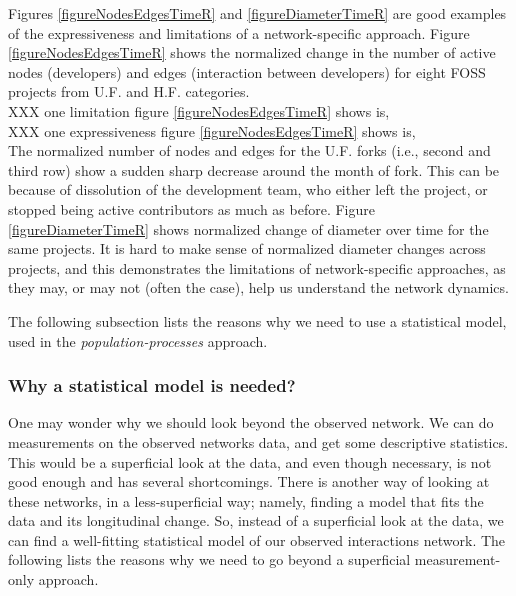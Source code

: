 \documentclass[11pt]{report}
\begin{document}
Figures \ref{figureNodesEdgesTimeR} and \ref{figureDiameterTimeR} are good examples of the expressiveness and limitations of a network-specific approach. Figure \ref{figureNodesEdgesTimeR} shows the normalized change in the number of active nodes (developers) and edges (interaction between developers) for eight FOSS projects from U.F. and H.F. categories. \\

XXX one limitation figure \ref{figureNodesEdgesTimeR} shows is, \\
XXX one expressiveness figure \ref{figureNodesEdgesTimeR} shows is, \\



The normalized number of nodes and edges for the U.F. forks (i.e., second and third row) show a sudden sharp decrease around the month of fork. This can be because of dissolution of the development team, who either left the project, or stopped being active contributors as much as before. Figure  \ref{figureDiameterTimeR} shows normalized change of diameter over time for the same projects. It is hard to make sense of normalized diameter changes across projects, and this demonstrates the limitations of network-specific approaches, as they may, or may not (often the case), help us understand the network dynamics.

The following subsection lists the reasons why we need to use a statistical model, used in the \textit{population-processes} approach.

\subsubsection{Why a statistical model is needed?}
One may wonder why we should look beyond the observed network. We can do measurements on the observed networks data, and get some descriptive statistics. This would be a superficial look at the data, and even though necessary, is not good enough and has several shortcomings. 
There is another way of looking at these networks, in a less-superficial way; namely, finding a model that fits the data and its longitudinal change. So, instead of a superficial look at the data, we can find a well-fitting statistical model of our observed interactions network. The following lists the reasons why we need to go beyond a superficial measurement-only approach. 
\end{document}
